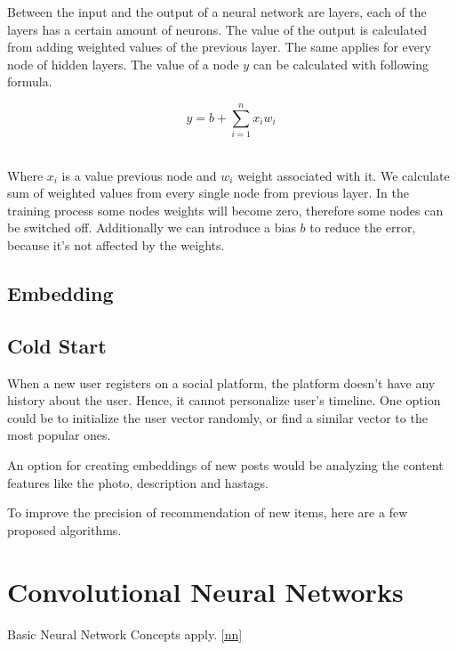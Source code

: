 Between the input and the output of a neural network are layers, each of the layers has a certain amount of neurons. \cite{GAO2020409} The value of the output is calculated from adding weighted values of the previous layer. The same applies for every node of hidden layers. The value of a node $y$ can be calculated with following formula. \cite{9784987} 

\[ y = b + \sum_{i=1}^{n} x_i w_i  \]\

Where $x_i$ is a value previous node and $w_i$ weight associated with it. We calculate sum of weighted values from every single node from previous layer. In the training process some nodes weights will become zero, therefore some nodes can be switched off. Additionally we can introduce a bias $b$ to reduce the error, because it's not affected by the weights. 

\subsection{Embedding}

\subsection{Cold Start}\label{cold-start}

When a new user registers on a social platform, the platform doesn't have any history about the user. Hence, it cannot personalize user's timeline. One option could be to initialize the user vector randomly, or find a similar vector to the most popular ones.

An option for creating embeddings of new posts would be analyzing the content features like the photo, description and hastags.

To improve the precision of recommendation of new items, here are a few proposed algorithms. 

\section{Convolutional Neural Networks}\label{cnn}
Basic Neural Network Concepts apply. \ref{nn} 

